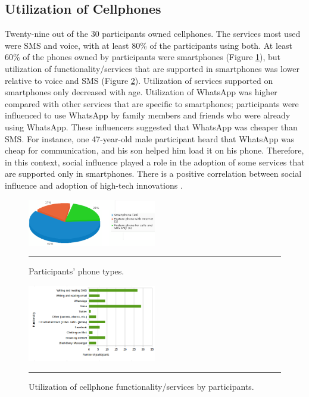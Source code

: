 \subsection{Utilization of Cellphones}
Twenty-nine out of the 30 participants owned cellphones. The services most used were SMS and voice, with at least 80\% of the participants using both. At least 60\% of the phones owned by participants were smartphones (Figure \ref{figure:cell_ownership}), but utilization of functionality/services that are supported in smartphones was lower relative to voice and SMS (Figure \ref{figure:cell_utilization}). Utilization of services supported on smartphones only decreased with age. Utilization of WhatsApp was higher compared with other services that are specific to smartphones; participants were influenced to use WhatsApp by family members and friends who were already using WhatsApp. These influencers suggested that WhatsApp was cheaper than SMS. For instance, one 47-year-old male participant heard that WhatsApp was cheap for communication, and his son helped him load it on his phone. Therefore, in this context, social influence played a role in the adoption of some services that are supported only in smartphones. There is a positive correlation between social influence and adoption of high-tech innovations \citep{vannoy2010social}.  

\begin{figure}[htbp]
  \centering
    \includegraphics[width=0.5\textwidth]{Figures/cell_ownership.png}
    \rule{35em}{0.5pt}
  \caption{Participants' phone types.}
  \label{figure:cell_ownership}
\end{figure}

\begin{figure}[htbp]
  \centering
    \includegraphics[width=0.5\textwidth]{Figures/cell_utilization.png}
    \rule{35em}{0.5pt}
  \caption{Utilization of cellphone functionality/services by participants.}
  \label{figure:cell_utilization}
\end{figure}
